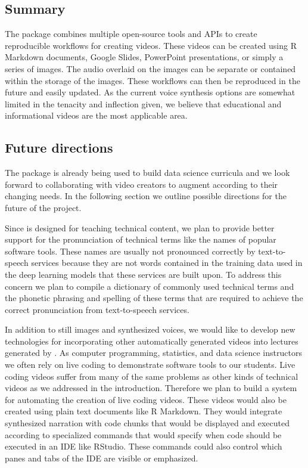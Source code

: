 \hypertarget{summary}{%
\subsection{Summary}\label{summary}}

The  package combines multiple open-source tools and APIs to
create reproducible workflows for creating videos. These videos can be
created using R Markdown documents, Google Slides, PowerPoint
presentations, or simply a series of images. The audio overlaid on the
images can be separate or contained within the storage of the images.
These workflows can then be reproduced in the future and easily updated.
As the current voice synthesis options are somewhat limited in the
tenacity and inflection given, we believe that educational and
informational videos are the most applicable area.

\hypertarget{future-directions}{%
\subsection{Future directions}\label{future-directions}}

The  package is already being used to build data science
curricula \citep{Kross-2019} and we look forward to collaborating with
video creators to augment  according to their changing needs.
In the following section we outline possible directions for the future
of the project.

Since  is designed for teaching technical content, we plan to
provide better support for the pronunciation of technical terms like the
names of popular software tools. These names are usually not pronounced
correctly by text-to-speech services because they are not words
contained in the training data used in the deep learning models that
these services are built upon. To address this concern we plan to
compile a dictionary of commonly used technical terms and the phonetic
phrasing and spelling of these terms that are required to achieve the
correct pronunciation from text-to-speech services.

In addition to still images and synthesized voices, we would like to
develop new technologies for incorporating other automatically generated
videos into lectures generated by . As computer programming,
statistics, and data science instructors we often rely on live coding
\citep{ChenLAS2019} to demonstrate software tools to our students. Live
coding videos suffer from many of the same problems as other kinds of
technical videos as we addressed in the introduction. Therefore we plan
to build a system for automating the creation of live coding videos.
These videos would also be created using plain text documents like R
Markdown. They would integrate synthesized narration with code chunks
that would be displayed and executed according to specialized commands
that would specify when code should be executed in an IDE like RStudio.
These commands could also control which panes and tabs of the IDE are
visible or emphasized.

